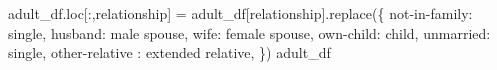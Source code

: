 \documentclass[
  letterpaper,
  DIV=11,
  numbers=noendperiod]{scrartcl}
\newenvironment{Shaded}{\begin{snugshade}}{\end{snugshade}}
\newcommand{\NormalTok}[1]{\textcolor[rgb]{0.00,0.23,0.31}{#1}}
\newcommand{\OperatorTok}[1]{\textcolor[rgb]{0.37,0.37,0.37}{#1}}
\newcommand{\StringTok}[1]{\textcolor[rgb]{0.13,0.47,0.30}{#1}}
\begin{document}
\begin{Shaded}
\begin{Highlighting}[]
\NormalTok{ adult\_df.loc[:,}\StringTok{\textquotesingle{}relationship\textquotesingle{}}\NormalTok{] }\OperatorTok{=}\NormalTok{ adult\_df[}\StringTok{\textquotesingle{}relationship\textquotesingle{}}\NormalTok{].replace(\{}
    \StringTok{\textquotesingle{}not{-}in{-}family\textquotesingle{}}\NormalTok{: }\StringTok{\textquotesingle{}single\textquotesingle{}}\NormalTok{,}
    \StringTok{\textquotesingle{}husband\textquotesingle{}}\NormalTok{: }\StringTok{\textquotesingle{}male spouse\textquotesingle{}}\NormalTok{,}
    \StringTok{\textquotesingle{}wife\textquotesingle{}}\NormalTok{: }\StringTok{\textquotesingle{}female spouse\textquotesingle{}}\NormalTok{,}
    \StringTok{\textquotesingle{}own{-}child\textquotesingle{}}\NormalTok{: }\StringTok{\textquotesingle{}child\textquotesingle{}}\NormalTok{,}
    \StringTok{\textquotesingle{}unmarried\textquotesingle{}}\NormalTok{: }\StringTok{\textquotesingle{}single\textquotesingle{}}\NormalTok{,}
    \StringTok{\textquotesingle{}other{-}relative\textquotesingle{}}\NormalTok{ : }\StringTok{\textquotesingle{}extended relative\textquotesingle{}}\NormalTok{,}
\NormalTok{\})}
\NormalTok{adult\_df}
\end{Highlighting}
\end{Shaded}
\end{document}
